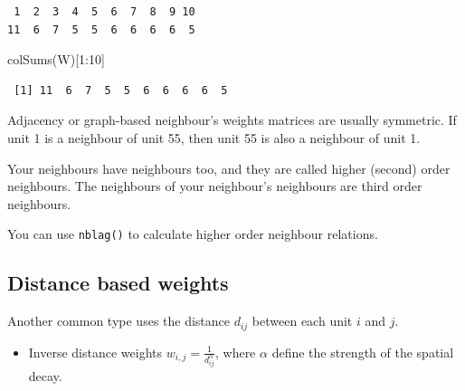\documentclass[
  letterpaper,
  DIV=11,
  numbers=noendperiod]{scrreprt}
\newenvironment{Shaded}{\begin{snugshade}}{\end{snugshade}}
\newcommand{\DecValTok}[1]{\textcolor[rgb]{0.68,0.00,0.00}{#1}}
\newcommand{\FunctionTok}[1]{\textcolor[rgb]{0.28,0.35,0.67}{#1}}
\newcommand{\NormalTok}[1]{\textcolor[rgb]{0.00,0.23,0.31}{#1}}
\newcommand{\SpecialCharTok}[1]{\textcolor[rgb]{0.37,0.37,0.37}{#1}}
\providecommand{\tightlist}{%
  \setlength{\itemsep}{0pt}\setlength{\parskip}{0pt}}\usepackage{longtable,booktabs,array}
\begin{document}
\begin{verbatim}
 1  2  3  4  5  6  7  8  9 10 
11  6  7  5  5  6  6  6  6  5 
\end{verbatim}

\begin{Shaded}
\begin{Highlighting}[]
\FunctionTok{colSums}\NormalTok{(W)[}\DecValTok{1}\SpecialCharTok{:}\DecValTok{10}\NormalTok{]}
\end{Highlighting}
\end{Shaded}

\begin{verbatim}
 [1] 11  6  7  5  5  6  6  6  6  5
\end{verbatim}

Adjacency or graph-based neighbour's weights matrices are usually
symmetric. If unit 1 is a neighbour of unit 55, then unit 55 is also a
neighbour of unit 1.

\begin{tcolorbox}[enhanced jigsaw, opacitybacktitle=0.6, left=2mm, leftrule=.75mm, toptitle=1mm, breakable, colback=white, bottomrule=.15mm, colframe=quarto-callout-tip-color-frame, colbacktitle=quarto-callout-tip-color!10!white, coltitle=black, bottomtitle=1mm, titlerule=0mm, title=\textcolor{quarto-callout-tip-color}{\faLightbulb}\hspace{0.5em}{Higher Order Neighbours}, opacityback=0, arc=.35mm, rightrule=.15mm, toprule=.15mm]

Your neighbours have neighbours too, and they are called higher (second)
order neighbours. The neighbours of your neighbour's neighbours are
third order neighbours.

You can use \texttt{nblag()} to calculate higher order neighbour
relations.

\end{tcolorbox}

\hypertarget{distance-based-weights}{%
\subsection{Distance based weights}\label{distance-based-weights}}

Another common type uses the distance \(d_{ij}\) between each unit \(i\)
and \(j\).

\begin{itemize}
\tightlist
\item
  Inverse distance weights \(w_{i,j} = \frac{1}{d_{ij}^\alpha}\), where
  \(\alpha\) define the strength of the spatial decay.
\end{itemize}
\end{document}
